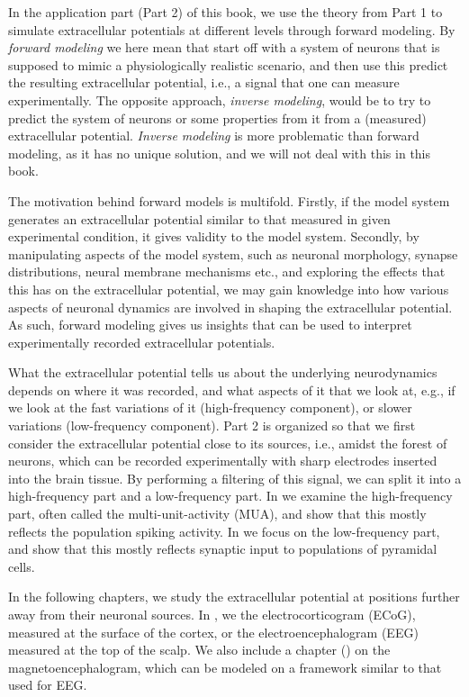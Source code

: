 In the application part (Part 2) of this book, we use the theory from Part 1 to simulate extracellular potentials at different levels through forward modeling. By \textit{forward modeling} we here mean that start off with a system of neurons that is supposed to mimic a physiologically realistic scenario, and then use this predict the resulting extracellular potential, i.e., a signal that one can measure experimentally. The opposite approach, \textit{inverse modeling}, would be to try to predict the system of neurons or some properties from it from a (measured) extracellular potential. \textit{Inverse modeling} is more problematic than forward modeling, as it has no unique solution, and we will not deal with this in this book.

The motivation behind forward models is multifold. Firstly, if the model system generates an extracellular potential similar to that measured in given experimental condition, it gives validity to the model system. Secondly, by manipulating aspects of the model system, such as neuronal morphology, synapse distributions, neural membrane mechanisms etc., and exploring the effects that this has on the extracellular potential, we may gain knowledge into how various aspects of neuronal dynamics are involved in shaping the extracellular potential. As such, forward modeling gives us insights that can be used to interpret experimentally recorded extracellular potentials.

What the extracellular potential tells us about the underlying neurodynamics depends on where it was recorded, and what aspects of it that we look at, e.g., if we look at the fast variations of it (high-frequency component), or slower variations (low-frequency component). Part 2 is organized so that we first consider the extracellular potential close to its sources, i.e., amidst the forest of neurons, which can be recorded experimentally with sharp electrodes inserted into the brain tissue. By performing a filtering of this signal, we can split it into a high-frequency part and a low-frequency part. In  we examine the high-frequency part, often called the multi-unit-activity (MUA), and show that this mostly reflects the population spiking activity. In  we focus on the low-frequency part, and show that this mostly reflects synaptic input to populations of pyramidal cells.

In the following chapters, we study the extracellular potential at positions further away from their neuronal sources. In , we the electrocorticogram (ECoG), measured at the surface of the cortex, or the electroencephalogram (EEG) measured at the top of the scalp. We also include a chapter () on the magnetoencephalogram, which can be modeled on a framework similar to that used for EEG.


